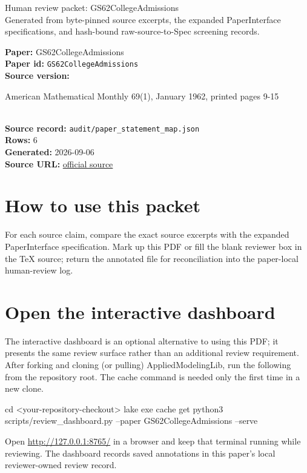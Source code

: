 \documentclass[10pt]{article}
\begin{document}
\fontsize{9}{10}\selectfont

\begin{center}
{\LARGE Human review packet: GS62CollegeAdmissions}\\[0.35em]
\small Generated from byte-pinned source excerpts, the expanded PaperInterface
specifications, and hash-bound raw-source-to-Spec screening records.
\end{center}

\noindent\textbf{Paper:} GS62CollegeAdmissions\\
\textbf{Paper id:} \texttt{GS62CollegeAdmissions}\\
\textbf{Source version:} \parbox[t]{0.76\linewidth}{\raggedright American Mathematical Monthly 69(1), January 1962, printed pages 9-15}\\
\textbf{Source record:} \texttt{audit/paper\_statement\_map.json}\\
\textbf{Rows:} 6\\
\textbf{Generated:} 2026-09-06\\
\textbf{Source URL:} \href{https://doi.org/10.1080/00029890.1962.11989827}{official source}





\section*{How to use this packet}
For each source claim, compare the exact source excerpts with the expanded
PaperInterface specification. Mark up this PDF or fill the blank reviewer box in the TeX source;
return the annotated file for reconciliation into the paper-local human-review
log.

\section*{Open the interactive dashboard}
The interactive dashboard is an optional alternative to using this PDF; it
presents the same review surface rather than an additional review requirement.
After forking and cloning (or pulling) AppliedModelingLib, run the following from the
repository root. The cache command is needed only the first time in a new clone.
\begin{ReviewVerbatim}
cd <your-repository-checkout>
lake exe cache get
python3 scripts/review_dashboard.py --paper GS62CollegeAdmissions --serve
\end{ReviewVerbatim}
Open \url{http://127.0.0.1:8765/} in a browser and keep that terminal running
while reviewing. The dashboard records saved annotations in this paper's local
reviewer-owned review record.
\end{document}
